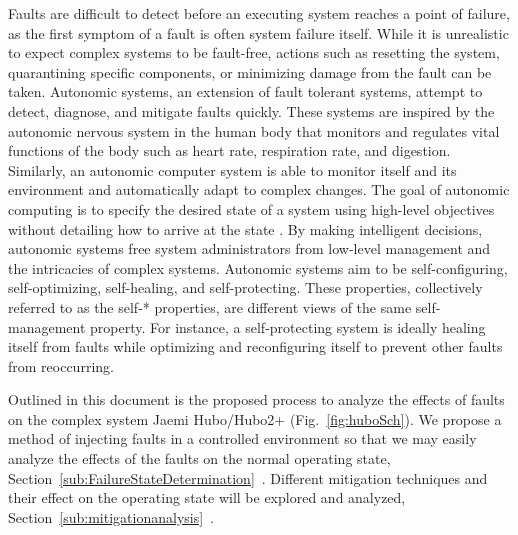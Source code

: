Faults are difficult to detect before an executing system reaches a point of failure, as the first symptom of a fault is often system failure itself. While it is unrealistic to expect complex systems to be fault-free, actions such as resetting the system, quarantining specific components, or minimizing damage from the fault can be taken. Autonomic systems, an extension of fault tolerant systems, attempt to detect, diagnose, and mitigate faults quickly. These systems are inspired by the autonomic nervous system in the human body that monitors and regulates vital  functions of the body such as heart rate, respiration rate, and digestion. Similarly, an autonomic computer system is able to monitor itself and its environment and automatically adapt to complex changes. The goal of autonomic computing is to specify the desired state of a system using high-level objectives without detailing how to arrive at the state \cite{1160055,4061119,1301340}. By making intelligent decisions, autonomic systems free system administrators from low-level management and the intricacies of complex systems. Autonomic systems aim to be self-configuring, self-optimizing, self-healing, and self-protecting. These properties, collectively referred to as the self-* properties, are different views of the same self-man\-age\-ment property. For instance, a self-protecting system is ideally healing itself from faults while optimizing and reconfiguring itself to prevent other faults from reoccurring.

Outlined in this document is the proposed process to analyze the effects of faults on the complex system Jaemi Hubo/Hubo2+ (Fig.~\ref{fig:huboSch}).  We propose a method of injecting faults in a controlled environment so that we may easily analyze the effects of the faults on the normal operating state, Section~\ref{sub:FailureStateDetermination}~.  Different mitigation techniques and their effect on the operating state will be explored and analyzed, Section~\ref{sub:mitigationanalysis}~.

